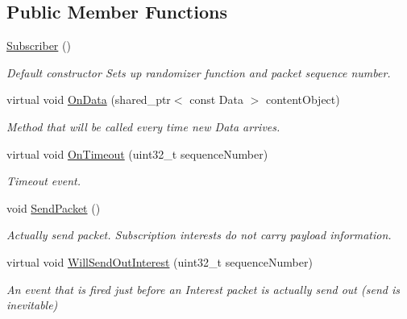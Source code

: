 \subsection*{Public Member Functions}
\begin{DoxyCompactItemize}
\item 
\hyperlink{classns3_1_1ndn_1_1Subscriber_a75cc9a8a2f5c908b0168973c5bad7b36}{Subscriber} ()\hypertarget{classns3_1_1ndn_1_1Subscriber_a75cc9a8a2f5c908b0168973c5bad7b36}{}\label{classns3_1_1ndn_1_1Subscriber_a75cc9a8a2f5c908b0168973c5bad7b36}

\begin{DoxyCompactList}\small\item\em Default constructor Sets up randomizer function and packet sequence number. \end{DoxyCompactList}\item 
virtual void \hyperlink{classns3_1_1ndn_1_1Subscriber_a72abe1eed4b4b2cdc4fe04f453492f49}{On\+Data} (shared\+\_\+ptr$<$ const Data $>$ content\+Object)
\begin{DoxyCompactList}\small\item\em Method that will be called every time new Data arrives. \end{DoxyCompactList}\item 
virtual void \hyperlink{classns3_1_1ndn_1_1Subscriber_af8e14e2e11c6a7920cff3730bf5fdb9b}{On\+Timeout} (uint32\+\_\+t sequence\+Number)
\begin{DoxyCompactList}\small\item\em Timeout event. \end{DoxyCompactList}\item 
void \hyperlink{classns3_1_1ndn_1_1Subscriber_a84f920b3ada70761dee3e6da1e548004}{Send\+Packet} ()\hypertarget{classns3_1_1ndn_1_1Subscriber_a84f920b3ada70761dee3e6da1e548004}{}\label{classns3_1_1ndn_1_1Subscriber_a84f920b3ada70761dee3e6da1e548004}

\begin{DoxyCompactList}\small\item\em Actually send packet. Subscription interests do not carry payload information. \end{DoxyCompactList}\item 
virtual void \hyperlink{classns3_1_1ndn_1_1Subscriber_aa8356a7d2bb6129d34efb0aa8aa11bc7}{Will\+Send\+Out\+Interest} (uint32\+\_\+t sequence\+Number)
\begin{DoxyCompactList}\small\item\em An event that is fired just before an Interest packet is actually send out (send is inevitable) \end{DoxyCompactList}\end{DoxyCompactItemize}
